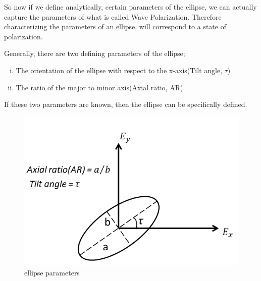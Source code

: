 So now if we define analytically, certain parameters of the ellipse, we can actually capture the parameters of what is called Wave Polarization. Therefore characterizing the parameters of an ellipse, will correspond to a state of polarization.

Generally, there are two defining parameters of the ellipse;
\begin{enumerate}[(i)]
\item The orientation of the ellipse with respect to the x-axis(Tilt angle, $\tau$) 
\item The ratio of the major to minor axis(Axial ratio, AR).
\end{enumerate}
If these two parameters are known, then the ellipse can be specifically defined.
\begin{figure}[h]
\centering
\includegraphics[width=1\linewidth]{./graphics/ellipse_parameters}
\caption{ellipse parameters}
\end{figure}

